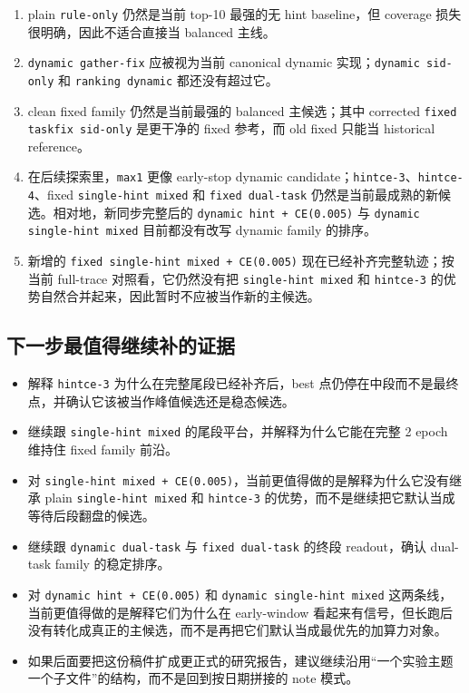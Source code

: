 \documentclass[11pt,a4paper]{ctexart}
\begin{document}
\begin{enumerate}
\item plain \texttt{rule-only} 仍然是当前 top-10 最强的无 hint baseline，但 coverage 损失很明确，因此不适合直接当 balanced 主线。
\item \texttt{dynamic gather-fix} 应被视为当前 canonical dynamic 实现；\texttt{dynamic sid-only} 和 \texttt{ranking dynamic} 都还没有超过它。
\item clean fixed family 仍然是当前最强的 balanced 主候选；其中 corrected \texttt{fixed taskfix sid-only} 是更干净的 fixed 参考，而 old fixed 只能当 historical reference。
\item 在后续探索里，\texttt{max1} 更像 early-stop dynamic candidate；\texttt{hintce-3}、\texttt{hintce-4}、fixed \texttt{single-hint mixed} 和 \texttt{fixed dual-task} 仍然是当前最成熟的新候选。相对地，新同步完整后的 \texttt{dynamic hint + CE(0.005)} 与 \texttt{dynamic single-hint mixed} 目前都没有改写 dynamic family 的排序。
\item 新增的 \texttt{fixed single-hint mixed + CE(0.005)} 现在已经补齐完整轨迹；按当前 full-trace 对照看，它仍然没有把 \texttt{single-hint mixed} 和 \texttt{hintce-3} 的优势自然合并起来，因此暂时不应被当作新的主候选。
\end{enumerate}

\subsection{下一步最值得继续补的证据}

\begin{itemize}
\item 解释 \texttt{hintce-3} 为什么在完整尾段已经补齐后，best 点仍停在中段而不是最终点，并确认它该被当作峰值候选还是稳态候选。
\item 继续跟 \texttt{single-hint mixed} 的尾段平台，并解释为什么它能在完整 2 epoch 维持住 fixed family 前沿。
\item 对 \texttt{single-hint mixed + CE(0.005)}，当前更值得做的是解释为什么它没有继承 plain \texttt{single-hint mixed} 和 \texttt{hintce-3} 的优势，而不是继续把它默认当成等待后段翻盘的候选。
\item 继续跟 \texttt{dynamic dual-task} 与 \texttt{fixed dual-task} 的终段 readout，确认 dual-task family 的稳定排序。
\item 对 \texttt{dynamic hint + CE(0.005)} 和 \texttt{dynamic single-hint mixed} 这两条线，当前更值得做的是解释它们为什么在 early-window 看起来有信号，但长跑后没有转化成真正的主候选，而不是再把它们默认当成最优先的加算力对象。
\item 如果后面要把这份稿件扩成更正式的研究报告，建议继续沿用“一个实验主题一个子文件”的结构，而不是回到按日期拼接的 note 模式。
\end{itemize}
\end{document}

